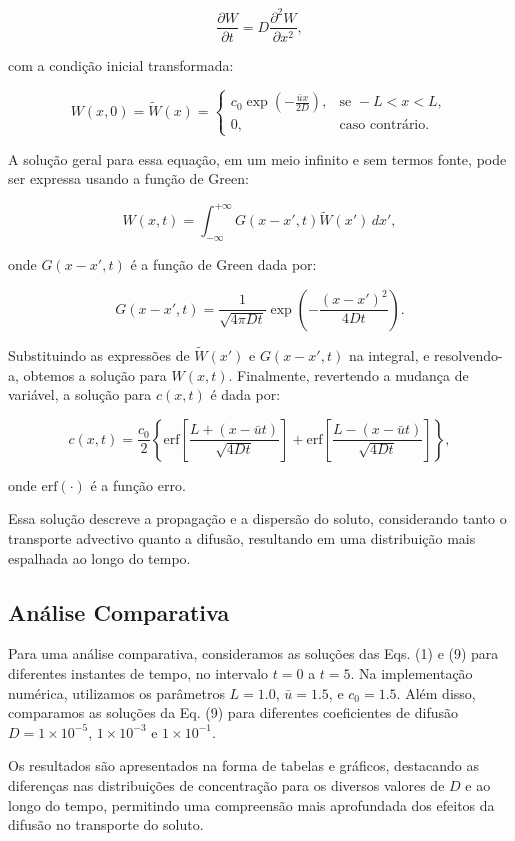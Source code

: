 \begin{equation}
    \frac{\partial W}{\partial t} = D \frac{\partial^2 W}{\partial x^2},
\end{equation}

com a condição inicial transformada:

\begin{equation}
    W(x, 0) = \tilde{W}(x) = \begin{cases}
    c_0 \exp\left( -\frac{\bar{u} x}{2D} \right), & \text{se } -L < x < L, \\
    0, & \text{caso contrário}.
    \end{cases}
\end{equation}

A solução geral para essa equação, em um meio infinito e sem termos fonte, pode ser expressa usando a função de Green:

\begin{equation}
    W(x, t) = \int_{-\infty}^{+\infty} G(x - x', t) \tilde{W}(x') \, dx',
\end{equation}

onde \( G(x - x', t) \) é a função de Green dada por:

\begin{equation}
    G(x - x', t) = \frac{1}{\sqrt{4\pi D t}} \exp\left( -\frac{(x - x')^2}{4Dt} \right).
\end{equation}

Substituindo as expressões de \( \tilde{W}(x') \) e \( G(x - x', t) \) na integral, e resolvendo-a, obtemos a solução para \( W(x, t) \). Finalmente, revertendo a mudança de variável, a solução para \( c(x, t) \) é dada por:

\begin{equation}
    c(x, t) = \frac{c_0}{2} \left\{ \text{erf} \left[ \frac{L + (x - \bar{u}t)}{\sqrt{4Dt}} \right] + \text{erf} \left[ \frac{L - (x - \bar{u}t)}{\sqrt{4Dt}} \right] \right\},
\end{equation}

onde \( \text{erf}(\cdot) \) é a função erro.

Essa solução descreve a propagação e a dispersão do soluto, considerando tanto o transporte advectivo quanto a difusão, resultando em uma distribuição mais espalhada ao longo do tempo.

\subsection{Análise Comparativa}

Para uma análise comparativa, consideramos as soluções das Eqs. (1) e (9) para diferentes instantes de tempo, no intervalo \( t = 0 \) a \( t = 5 \). Na implementação numérica, utilizamos os parâmetros \( L = 1.0 \), \( \bar{u} = 1.5 \), e \( c_0 = 1.5 \). Além disso, comparamos as soluções da Eq. (9) para diferentes coeficientes de difusão \( D = 1 \times 10^{-5} \), \( 1 \times 10^{-3} \) e \( 1 \times 10^{-1} \).

Os resultados são apresentados na forma de tabelas e gráficos, destacando as diferenças nas distribuições de concentração para os diversos valores de \( D \) e ao longo do tempo, permitindo uma compreensão mais aprofundada dos efeitos da difusão no transporte do soluto.
